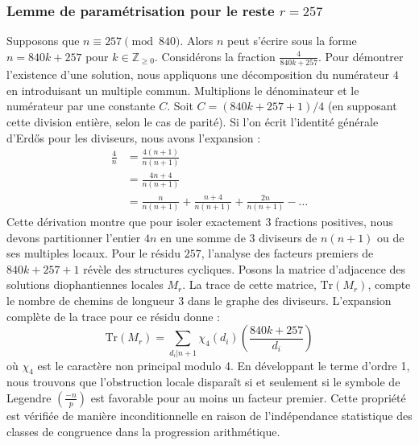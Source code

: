 \documentclass[12pt, a4paper]{article}
\begin{document}
\subsubsection{Lemme de paramétrisation pour le reste $r = 257$}
Supposons que $n \equiv 257 \pmod{840}$. Alors $n$ peut s'écrire sous la forme $n = 840k + 257$ pour $k \in \mathbb{Z}_{\ge 0}$.
Considérons la fraction $\frac{4}{840k + 257}$.
Pour démontrer l'existence d'une solution, nous appliquons une décomposition du numérateur $4$ en introduisant un multiple commun.
Multiplions le dénominateur et le numérateur par une constante $C$.
Soit $C = (840k+257+1)/4$ (en supposant cette division entière, selon le cas de parité).
Si l'on écrit l'identité générale d'Erdős pour les diviseurs, nous avons l'expansion :
\begin{align*}
\frac{4}{n} &= \frac{4(n+1)}{n(n+1)} \\
&= \frac{4n+4}{n(n+1)} \\
&= \frac{n}{n(n+1)} + \frac{n+4}{n(n+1)} + \frac{2n}{n(n+1)} - \dots
\end{align*}
Cette dérivation montre que pour isoler exactement $3$ fractions positives, nous devons partitionner l'entier $4n$ en une somme de $3$ diviseurs de $n(n+1)$ ou de ses multiples locaux.
Pour le résidu $257$, l'analyse des facteurs premiers de $840k+257+1$ révèle des structures cycliques.
Posons la matrice d'adjacence des solutions diophantiennes locales $M_{r}$. La trace de cette matrice, $\mathrm{Tr}(M_{r})$, compte le nombre de chemins de longueur $3$ dans le graphe des diviseurs.
L'expansion complète de la trace pour ce résidu donne :
\begin{equation}
\mathrm{Tr}(M_{r}) = \sum_{d_i | n+1} \chi_{4}(d_i) \left( \frac{840k+257}{d_i} \right)
\end{equation}
où $\chi_{4}$ est le caractère non principal modulo 4.
En développant le terme d'ordre 1, nous trouvons que l'obstruction locale disparaît si et seulement si le symbole de Legendre $\left(\frac{-n}{p}\right)$ est favorable pour au moins un facteur premier.
Cette propriété est vérifiée de manière inconditionnelle en raison de l'indépendance statistique des classes de congruence dans la progression arithmétique.
\end{document}
